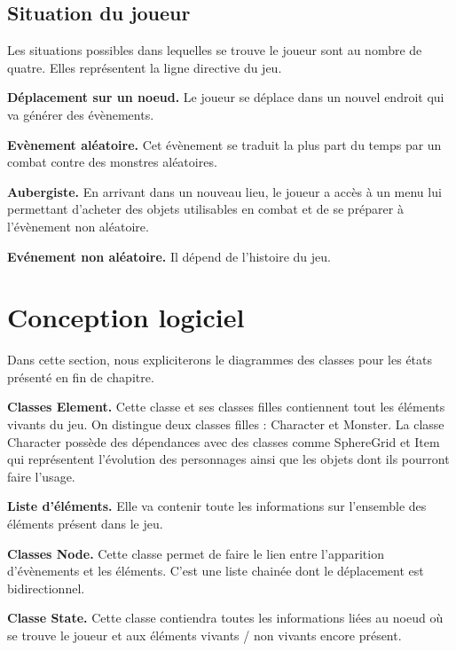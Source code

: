 \documentclass[12pt,a4paper]{report}
\begin{document}
\subsection{Situation du joueur}

Les situations possibles dans lequelles se trouve le joueur sont au nombre de quatre. Elles repr\'{e}sentent la ligne directive du jeu.

\textbf{D\'{e}placement sur un noeud.} Le joueur se d\'{e}place dans un nouvel endroit qui va g\'{e}n\'{e}rer des \'{e}v\`{e}nements. 

\textbf{Ev\`{e}nement al\'{e}atoire.} Cet \'{e}v\`{e}nement se traduit la plus part du temps par un combat contre des monstres al\'{e}atoires.

\textbf{Aubergiste.} En arrivant dans un nouveau lieu, le joueur a acc\`{e}s \`{a} un menu lui permettant d'acheter des objets utilisables en combat et de se pr\'{e}parer \`{a} l'\'{e}v\`{e}nement non al\'{e}atoire.

\textbf{Ev\'{e}nement non al\'{e}atoire.} Il d\'{e}pend de l'histoire du jeu.

\newpage

\section{Conception logiciel}

Dans cette section, nous expliciterons le diagrammes des classes pour les \'{e}tats pr\'{e}sent\'{e} en fin de chapitre. 

\textbf{Classes Element.} Cette classe et ses classes filles contiennent tout les \'{e}l\'{e}ments vivants du jeu. On distingue deux classes filles : Character et Monster. La classe Character possède des dépendances avec des classes comme SphereGrid et Item qui représentent l'\'{e}volution des personnages ainsi que les objets dont ils pourront faire l'usage. 

\textbf{Liste d'\'{e}l\'{e}ments.} Elle va contenir toute les informations sur l'ensemble des \'{e}l\'{e}ments pr\'{e}sent dans le jeu. 

\textbf{Classes Node.} Cette classe permet de faire le lien entre l'apparition d'\'{e}v\`{e}nements et les \'{e}l\'{e}ments. C'est une liste chain\'{e}e dont le d\'{e}placement est bidirectionnel. 

\textbf{Classe State.} Cette classe contiendra toutes les informations li\'{e}es au noeud o\`{u} se trouve le joueur et aux \'{e}l\'{e}ments vivants / non vivants encore pr\'{e}sent.
\end{document}
